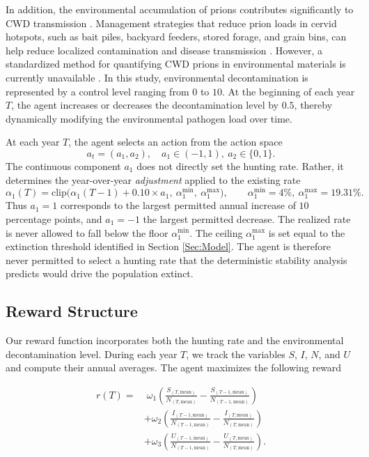 \documentclass[12pt,a4paper,reqno]{amsart}
\theoremstyle{definition}
\theoremstyle{remark}
\theoremstyle{plain}
\begin{document}
In addition, the environmental accumulation of prions contributes significantly to CWD transmission \cite{almberg2011modeling}. Management strategies that reduce prion loads in cervid hotspots, such as bait piles, backyard feeders, stored forage, and grain bins, can help reduce localized contamination and disease transmission \cite{wvjen}. However, a standardized method for quantifying CWD prions in environmental materials is currently unavailable \cite{yuan2022sensitive}. In this study, environmental decontamination is represented by a control level ranging from $0$ to $10$. At the beginning of each year $T$, the agent increases or decreases the decontamination level by $0.5$, thereby dynamically modifying the environmental pathogen load over time.

At each year $T$, the agent selects an action from the action space
\begin{equation}
    a_t = (a_1, a_2),\quad a_1 \in (-1,1),\ a_2 \in \{0,1\}.
\end{equation}
The continuous component $a_1$ does not directly set the hunting rate. Rather, it determines the year-over-year \emph{adjustment} applied to the existing rate
\begin{equation}\label{HuntingUpdate}
    \alpha_1(T) = \mathrm{clip}\Big(\alpha_1(T-1) + 0.10\times a_1,\ \alpha_1^{\min},\ \alpha_1^{\max}\Big),
\qquad \alpha_1^{\min}=4\%,\ \alpha_1^{\max}=19.31\%.
\end{equation}
Thus $a_1=1$ corresponds to the largest permitted annual increase of $10$ percentage points, and $a_1=-1$ the largest permitted decrease. The realized rate is never allowed to fall below the floor $\alpha_1^{\min}$. The ceiling $\alpha_1^{\max}$ is set equal to the extinction threshold identified in Section \ref{Sec:Model}. The agent is therefore never permitted to select a hunting rate that the deterministic stability analysis predicts would drive the population extinct.

\subsection{Reward Structure}

Our reward function incorporates both the hunting rate and the environmental decontamination level. During each year $T$, we track the variables $S$, $I$, $N$, and $U$ and compute their annual averages. The agent maximizes the following reward

\begin{equation}\label{Rfn}
\begin{split}
r(T)=&
\;\omega_1\left(
\frac{S_{(T,\mathrm{mean})}}{N_{(T,\mathrm{mean})}}
-
\frac{S_{(T-1,\mathrm{mean})}}{N_{(T-1,\mathrm{mean})}}
\right)
\\
&+\omega_2\left(
\frac{I_{(T-1,\mathrm{mean})}}{N_{(T-1,\mathrm{mean})}}
-
\frac{I_{(T,\mathrm{mean})}}{N_{(T,\mathrm{mean})}}
\right)
\\
&+\omega_3\left(
\frac{U_{(T-1,\mathrm{mean})}}{N_{(T-1,\mathrm{mean})}}
-
\frac{U_{(T,\mathrm{mean})}}{N_{(T,\mathrm{mean})}}
\right).
\end{split}
\end{equation}
\end{document}
